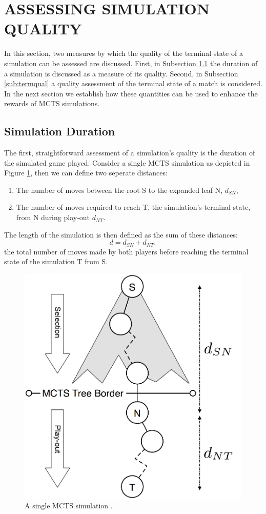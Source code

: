 \documentclass{ecai2014}
\newcommand{\node}[1]{{\fontfamily{phv}\selectfont#1}}
\begin{document}
\section{ASSESSING SIMULATION QUALITY}
\label{sec:poqual}
In this section, two measures by which the quality of the terminal state of a simulation can be assessed are discussed. First, in Subsection \ref{sub:simdur} the duration of a simulation is discussed as a measure of its quality. Second, in Subsection \ref{sub:termqual} a quality assessment of the terminal state of a match is considered. In the next section we establish how these quantities can be used to enhance the rewards of MCTS simulations.

\subsection{Simulation Duration} 
\label{sub:simdur}
The first, straightforward assessment of a simulation's quality is the duration of the simulated game played. Consider a single MCTS simulation as depicted in Figure \ref{fig:mcts-simulation}, then we can define two seperate distances: 
\begin{enumerate}
\item The number of moves between the root \node{S} to the expanded leaf \node{N}, $d_{SN}$,
\item The number of moves required to reach \node{T}, the simulation's terminal state, from \node{N} during play-out $d_{NT}$.
\end{enumerate}
The length of the simulation is then defined as the sum of these distances:
\begin{equation}
d = d_{SN} + d_{NT},
\label{eq:m_ST}
\end{equation}
the total number of moves made by both players before reaching the terminal state of the simulation \node{T} from \node{S}.
\begin{figure}[t]
	\centering
	\includegraphics[width=.3\textwidth]{img/figure2_new.png}
	\caption{A single MCTS simulation \cite{finnsson2010learning}.}
	\label{fig:mcts-simulation}
\end{figure}
\end{document}
